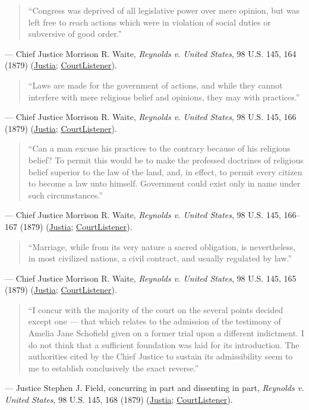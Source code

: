 \documentclass[12pt]{article}
\begin{document}
\begin{quote}
``Congress was deprived of all legislative power over mere opinion, but was left free to reach actions which were in violation of social duties or subversive of good order.''
\end{quote}
\noindent --- Chief Justice Morrison R. Waite, \textit{Reynolds v. United States}, 98 U.S. 145, 164 (1879) (\href{https://supreme.justia.com/cases/federal/us/98/145/}{Justia}; \href{https://www.courtlistener.com/opinion/89858/reynolds-v-united-states/}{CourtListener}).

\begin{quote}
``Laws are made for the government of actions, and while they cannot interfere with mere religious belief and opinions, they may with practices.''
\end{quote}
\noindent --- Chief Justice Morrison R. Waite, \textit{Reynolds v. United States}, 98 U.S. 145, 166 (1879) (\href{https://supreme.justia.com/cases/federal/us/98/145/}{Justia}; \href{https://www.courtlistener.com/opinion/89858/reynolds-v-united-states/}{CourtListener}).

\begin{quote}
``Can a man excuse his practices to the contrary because of his religious belief? To permit this would be to make the professed doctrines of religious belief superior to the law of the land, and, in effect, to permit every citizen to become a law unto himself. Government could exist only in name under such circumstances.''
\end{quote}
\noindent --- Chief Justice Morrison R. Waite, \textit{Reynolds v. United States}, 98 U.S. 145, 166--167 (1879) (\href{https://supreme.justia.com/cases/federal/us/98/145/}{Justia}; \href{https://www.courtlistener.com/opinion/89858/reynolds-v-united-states/}{CourtListener}).

\begin{quote}
``Marriage, while from its very nature a sacred obligation, is nevertheless, in most civilized nations, a civil contract, and usually regulated by law.''
\end{quote}
\noindent --- Chief Justice Morrison R. Waite, \textit{Reynolds v. United States}, 98 U.S. 145, 165 (1879) (\href{https://supreme.justia.com/cases/federal/us/98/145/}{Justia}; \href{https://www.courtlistener.com/opinion/89858/reynolds-v-united-states/}{CourtListener}).

\begin{quote}
``I concur with the majority of the court on the several points decided except one --- that which relates to the admission of the testimony of Amelia Jane Schofield given on a former trial upon a different indictment. I do not think that a sufficient foundation was laid for its introduction. The authorities cited by the Chief Justice to sustain its admissibility seem to me to establish conclusively the exact reverse.''
\end{quote}
\noindent --- Justice Stephen J. Field, concurring in part and dissenting in part, \textit{Reynolds v. United States}, 98 U.S. 145, 168 (1879) (\href{https://supreme.justia.com/cases/federal/us/98/145/}{Justia}; \href{https://www.courtlistener.com/opinion/89858/reynolds-v-united-states/}{CourtListener}).
\end{document}
